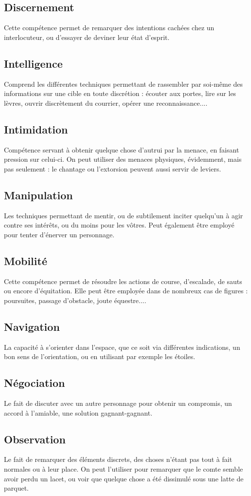 \documentclass[10pt,a4paper]{book}
\begin{document}
\subsection*{Discernement}Cette compétence permet de remarquer des intentions cachées chez un interlocuteur, ou d'essayer de deviner leur état d'esprit. 
\subsection*{Intelligence}Comprend les différentes techniques permettant de rassembler par soi-même des informations sur une cible en toute discrétion : écouter aux portes, lire sur les lèvres, ouvrir discrètement du courrier, opérer une reconnaissance....
\subsection*{Intimidation}Compétence servant à obtenir quelque chose d'autrui par la menace, en faisant pression sur celui-ci. On peut utiliser des menaces physiques, évidemment, mais pas seulement : le chantage ou l'extorsion peuvent aussi servir de leviers.
\subsection*{Manipulation}Les techniques permettant de mentir, ou de subtilement inciter quelqu'un à agir contre ses intérêts, ou du moins pour les vôtres. Peut également être employé pour tenter d'énerver un personnage.
\subsection*{Mobilité} Cette compétence permet de résoudre les actions de course, d'escalade, de sauts ou encore d'équitation. Elle peut être employée dans de nombreux cas de figures : poursuites, passage d'obstacle, joute équestre.... 
\subsection*{Navigation} La capacité à s'orienter dans l'espace, que ce soit via différentes indications, un bon sens de l'orientation, ou en utilisant par exemple les étoiles.
\subsection*{Négociation} Le fait de discuter avec un autre personnage pour obtenir un compromis, un accord à l'amiable, une solution gagnant-gagnant.
\subsection*{Observation}Le fait de remarquer des éléments discrets, des choses n'étant pas tout à fait normales ou à leur place. On peut l'utiliser pour remarquer que le comte semble avoir perdu un lacet, ou voir que quelque chose a été dissimulé sous une latte de parquet.
\end{document}
